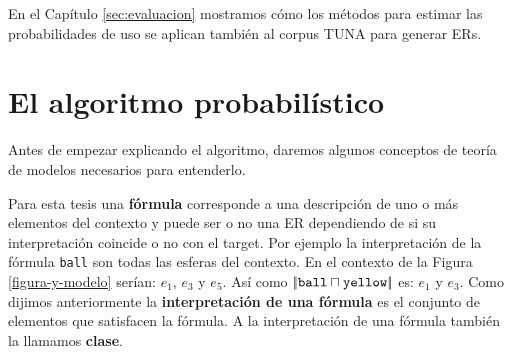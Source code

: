 En el Cap\'itulo \ref{sec:evaluacion} mostramos c\'omo los m\'etodos para estimar las probabilidades de uso se aplican tambi\'en al corpus TUNA para generar ERs.

\section{El algoritmo probabil\'istico}
\label{sec:algoritmo_probabilistico}
Antes de empezar explicando el algoritmo, daremos algunos conceptos de teor\'ia de modelos necesarios para entenderlo.

Para esta tesis una \textbf{f\'ormula} corresponde a una descripci\'on de uno o m\'as elementos del contexto y puede ser o no una ER dependiendo de 
si su interpretaci\'on coincide o no con el target. Por ejemplo la interpretaci\'on de la f\'ormula \texttt{ball} son todas las esferas 
del contexto. En el contexto de la Figura \ref{figura-y-modelo} ser\'ian: $e_1$, $e_3$ y $e_5$. As\'i como $|\!|\texttt{ball} \sqcap \texttt{yellow}|\!|$ es: $e_1$ y $e_3$.
Como dijimos anteriormente la \textbf{interpretaci\'on de una f\'ormula} es el conjunto de elementos que satisfacen la f\'ormula. A la interpretaci\'on de una f\'ormula tambi\'en la llamamos \textbf{clase}.

